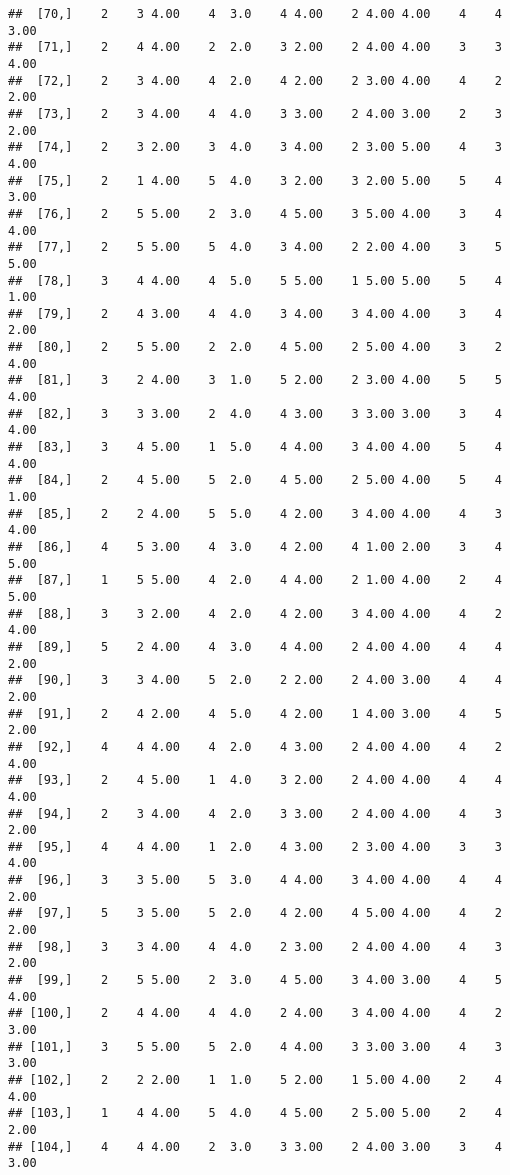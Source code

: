 \documentclass[]{article}
\begin{document}
\begin{verbatim}
##  [70,]    2    3 4.00    4  3.0    4 4.00    2 4.00 4.00    4    4 3.00
##  [71,]    2    4 4.00    2  2.0    3 2.00    2 4.00 4.00    3    3 4.00
##  [72,]    2    3 4.00    4  2.0    4 2.00    2 3.00 4.00    4    2 2.00
##  [73,]    2    3 4.00    4  4.0    3 3.00    2 4.00 3.00    2    3 2.00
##  [74,]    2    3 2.00    3  4.0    3 4.00    2 3.00 5.00    4    3 4.00
##  [75,]    2    1 4.00    5  4.0    3 2.00    3 2.00 5.00    5    4 3.00
##  [76,]    2    5 5.00    2  3.0    4 5.00    3 5.00 4.00    3    4 4.00
##  [77,]    2    5 5.00    5  4.0    3 4.00    2 2.00 4.00    3    5 5.00
##  [78,]    3    4 4.00    4  5.0    5 5.00    1 5.00 5.00    5    4 1.00
##  [79,]    2    4 3.00    4  4.0    3 4.00    3 4.00 4.00    3    4 2.00
##  [80,]    2    5 5.00    2  2.0    4 5.00    2 5.00 4.00    3    2 4.00
##  [81,]    3    2 4.00    3  1.0    5 2.00    2 3.00 4.00    5    5 4.00
##  [82,]    3    3 3.00    2  4.0    4 3.00    3 3.00 3.00    3    4 4.00
##  [83,]    3    4 5.00    1  5.0    4 4.00    3 4.00 4.00    5    4 4.00
##  [84,]    2    4 5.00    5  2.0    4 5.00    2 5.00 4.00    5    4 1.00
##  [85,]    2    2 4.00    5  5.0    4 2.00    3 4.00 4.00    4    3 4.00
##  [86,]    4    5 3.00    4  3.0    4 2.00    4 1.00 2.00    3    4 5.00
##  [87,]    1    5 5.00    4  2.0    4 4.00    2 1.00 4.00    2    4 5.00
##  [88,]    3    3 2.00    4  2.0    4 2.00    3 4.00 4.00    4    2 4.00
##  [89,]    5    2 4.00    4  3.0    4 4.00    2 4.00 4.00    4    4 2.00
##  [90,]    3    3 4.00    5  2.0    2 2.00    2 4.00 3.00    4    4 2.00
##  [91,]    2    4 2.00    4  5.0    4 2.00    1 4.00 3.00    4    5 2.00
##  [92,]    4    4 4.00    4  2.0    4 3.00    2 4.00 4.00    4    2 4.00
##  [93,]    2    4 5.00    1  4.0    3 2.00    2 4.00 4.00    4    4 4.00
##  [94,]    2    3 4.00    4  2.0    3 3.00    2 4.00 4.00    4    3 2.00
##  [95,]    4    4 4.00    1  2.0    4 3.00    2 3.00 4.00    3    3 4.00
##  [96,]    3    3 5.00    5  3.0    4 4.00    3 4.00 4.00    4    4 2.00
##  [97,]    5    3 5.00    5  2.0    4 2.00    4 5.00 4.00    4    2 2.00
##  [98,]    3    3 4.00    4  4.0    2 3.00    2 4.00 4.00    4    3 2.00
##  [99,]    2    5 5.00    2  3.0    4 5.00    3 4.00 3.00    4    5 4.00
## [100,]    2    4 4.00    4  4.0    2 4.00    3 4.00 4.00    4    2 3.00
## [101,]    3    5 5.00    5  2.0    4 4.00    3 3.00 3.00    4    3 3.00
## [102,]    2    2 2.00    1  1.0    5 2.00    1 5.00 4.00    2    4 4.00
## [103,]    1    4 4.00    5  4.0    4 5.00    2 5.00 5.00    2    4 2.00
## [104,]    4    4 4.00    2  3.0    3 3.00    2 4.00 3.00    3    4 3.00

\end{verbatim}
\end{document}
